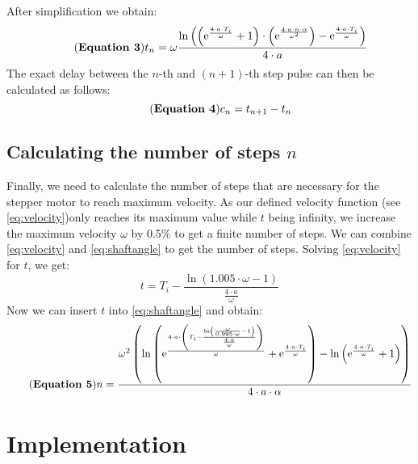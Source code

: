 \documentclass[hidelinks, 11pt, fleqn]{article}   	%
\begin{document}
\newline
After simplification we obtain:
%
\begin{equation}\tag{\textbf{Equation 3}}\label{eq:tn}
t_{n} = \omega \frac{\ln\left(\left(\mathrm{e}^\frac{4 \cdot a \cdot T_{i}}{\omega}+1\right) \cdot \left(\mathrm{e}^{\frac{4 \cdot a \cdot n \cdot \alpha}{\omega^2}}\right) - \mathrm{e}^\frac{4 \cdot a \cdot T_{i}}{\omega}\right)}{4 \cdot a}
\end{equation}
\newline
The exact delay between the $n$-th and $(n+1)$-th step pulse can then be calculated as follows:
%
\begin{equation}\tag{\textbf{Equation 4}}\label{eq:cn}
c_{n} = t_{n+1} - t_{n}
\end{equation}
%
\subsection{Calculating the number of steps $n$}
Finally, we need to calculate the number of steps that are necessary for the stepper motor to reach maximum velocity. As our defined velocity function (see \eqref{eq:velocity})only reaches its maximum value while $t$ being infinity, we increase the maximum velocity $\omega$ by 0.5\% to get a finite number of steps. We can combine \eqref{eq:velocity} and \eqref{eq:shaftangle} to get the number of steps. 
\newline
\newline
Solving \eqref{eq:velocity} for $t$, we get:
\begin{equation*}
t = T_{i} - \frac{\ln\left(1.005 \cdot \omega-1\right)}{\frac{4 \cdot a}{\omega}}
\end{equation*}
\newline
Now we can insert $t$ into \eqref{eq:shaftangle} and obtain:
\begin{equation}\tag{\textbf{Equation 5}}\label{eq:nsteps}
n = \dfrac{\omega^2\left(\ln\left(\mathrm{e}^\frac{4 \cdot a \cdot \left(T_{i} - \frac{\ln\left(\frac{\omega}{0.995 \cdot \omega}-1\right)}{\frac{4 \cdot a}{\omega}}\right)}{\omega}+\mathrm{e}^\frac{4 \cdot a \cdot T_{i}}{\omega}\right)-\ln\left(\mathrm{e}^\frac{4 \cdot a \cdot T_{i}}{\omega}+1\right)\right)}{4 \cdot a \cdot \alpha}
\end{equation}
\pagebreak
\section{Implementation}
\end{document}

